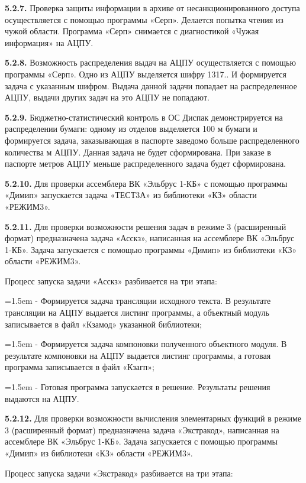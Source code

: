 \documentclass[11pt,a4paper]{article}
\begin{document}
\par\textbf{5.2.7.} Проверка защиты информации в архиве от несанкционированного доступа осуществляется с помощью программы «Серп». Делается попытка чтения из чужой области. Программа «Серп» снимается с диагностикой «Чужая информация» на АЦПУ.\par
\par\textbf{5.2.8.} Возможность распределения выдач на АЦПУ осуществляется с помощью программы «Серп». Одно из АЦПУ выделяется шифру 1317.. И формируется задача с указанным шифром. Выдача данной задачи попадает на распределенное АЦПУ, выдачи других задач на это АЦПУ не попадают.\par
\par\textbf{5.2.9.} Бюджетно-статистический контроль в ОС Диспак демонстрируется на распределении бумаги: одному из отделов выделяется 100 м бумаги и формируется задача, заказывающая в паспорте заведомо больше распределенного количества м АЦПУ. Данная задача не будет сформирована. При заказе в паспорте метров АЦПУ меньше распределенного задача будет сформирована.\par
\par\textbf{5.2.10.} Для проверки ассемблера ВК «Эльбрус 1-КБ» с помощью программы «Димип» запускается задача «ТЕСТ3А» из библиотеки «КЗ» области «РЕЖИМ3».\par
\par\textbf{5.2.11.} Для проверки возможности решения задач в режиме 3 (расширенный формат) предназначена задача «Асскз», написанная на ассемблере ВК «Эльбрус 1-КБ». Задача запускается с помощью программы «Димип» из библиотеки «КЗ» области «РЕЖИМ3».\par
Процесс запуска задачи «Асскз» разбивается на три этапа:

\par\hangindent=1.5em - Формируется задача трансляции исходного текста. В результате трансляции на АЦПУ выдается листинг программы, а объектный модуль записывается в файл «Кзамод» указанной библиотеки;\par
\par\hangindent=1.5em - Формируется задача компоновки полученного объектного модуля. В результате компоновки на АЦПУ выдается листинг программы, а готовая программа записывается в файл «Кзагп»;\par
\par\hangindent=1.5em - Готовая программа запускается в решение. Результаты решения выдаются на АЦПУ.\par
\par\textbf{5.2.12.} Для проверки возможности вычисления элементарных функций в режиме 3 (расширенный формат) предназначена задача «Экстракод», написанная на ассемблере ВК «Эльбрус 1-КБ». Задача запускается с помощью программы «Димип» из библиотеки «КЗ» области «РЕЖИМ3».\par
Процесс запуска задачи «Экстракод» разбивается на три этапа:
\end{document}
